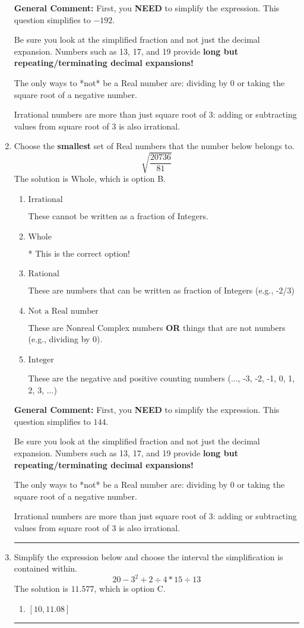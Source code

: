 \documentclass{extbook}[14pt]
\newcommand{\litem}[1]{\item #1

\rule{\textwidth}{0.4pt}}
\begin{document}
\begin{enumerate}
{\textbf{General Comment:} First, you \textbf{NEED} to simplify the expression. This question simplifies to $-192$. 
 
 Be sure you look at the simplified fraction and not just the decimal expansion. Numbers such as 13, 17, and 19 provide \textbf{long but repeating/terminating decimal expansions!} 
 
 The only ways to *not* be a Real number are: dividing by 0 or taking the square root of a negative number. 
 
 Irrational numbers are more than just square root of 3: adding or subtracting values from square root of 3 is also irrational.
}
\litem{
Choose the \textbf{smallest} set of Real numbers that the number below belongs to.
\[ \sqrt{\frac{20736}{81}} \]The solution is \( \text{Whole} \), which is option B.\begin{enumerate}[label=\Alph*.]
\item \( \text{Irrational} \)

These cannot be written as a fraction of Integers.
\item \( \text{Whole} \)

* This is the correct option!
\item \( \text{Rational} \)

These are numbers that can be written as fraction of Integers (e.g., -2/3)
\item \( \text{Not a Real number} \)

These are Nonreal Complex numbers \textbf{OR} things that are not numbers (e.g., dividing by 0).
\item \( \text{Integer} \)

These are the negative and positive counting numbers (..., -3, -2, -1, 0, 1, 2, 3, ...)
\end{enumerate}

\textbf{General Comment:} First, you \textbf{NEED} to simplify the expression. This question simplifies to $144$. 
 
 Be sure you look at the simplified fraction and not just the decimal expansion. Numbers such as 13, 17, and 19 provide \textbf{long but repeating/terminating decimal expansions!} 
 
 The only ways to *not* be a Real number are: dividing by 0 or taking the square root of a negative number. 
 
 Irrational numbers are more than just square root of 3: adding or subtracting values from square root of 3 is also irrational.
}
\litem{
Simplify the expression below and choose the interval the simplification is contained within.
\[ 20 - 3^2 + 2 \div 4 * 15 \div 13 \]The solution is \( 11.577 \), which is option C.\begin{enumerate}[label=\Alph*.]
\item \( [10, 11.08] \)


\end{enumerate}}
\end{enumerate}
\end{document}

